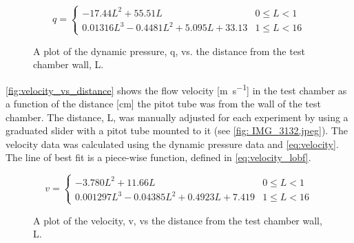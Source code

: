 \begin{equation} \label{eq:dynamic_pressure_lobf}
q = \begin{cases}
        -17.44L^2 + 55.51L & 0 \leq L < 1 \\
        0.01316L^3 - 0.4481L^2 + 5.095L + 33.13 & 1 \leq L < 16
    \end{cases}
\end{equation}

\begin{figure}[htpb]
    \centering
    
    \caption[Plot of dynamic pressure vs. the distance from the test chamber wall.]{A plot of the dynamic pressure, \gls{q}, vs. the distance from the test chamber wall, \gls{L}.}
    \label{fig:dynamic_pressure_vs_distance}
\end{figure}

\autoref{fig:velocity_vs_distance} shows the flow velocity [\unit{\meter\per\second}] in the test chamber as a function of the distance [\unit{\centi\meter}] the pitot tube was from the wall of the test chamber. The distance, \gls{L}, was manually adjusted for each experiment by using a graduated slider with a pitot tube mounted to it (see \autoref{fig: IMG_3132.jpeg}). The velocity data was calculated using the dynamic pressure data and \autoref{eq:velocity}. The line of best fit is a piece-wise function, defined in \autoref{eq:velocity_lobf}.

\begin{equation} \label{eq:velocity_lobf}
v = \begin{cases}
        -3.780L^2 + 11.66L & 0 \leq L < 1 \\
        0.001297L^3 - 0.04385L^2 + 0.4923L + 7.419 & 1 \leq L < 16
    \end{cases}
\end{equation}

\begin{figure}[htpb]
    \centering
    
    \caption[Plot of velocity vs. the distance from the test chamber wall.]{A plot of the velocity, \gls{v}, vs the distance from the test chamber wall, \gls{L}.}
    \label{fig:velocity_vs_distance}
    \vspace*{5.5in}
\end{figure}

